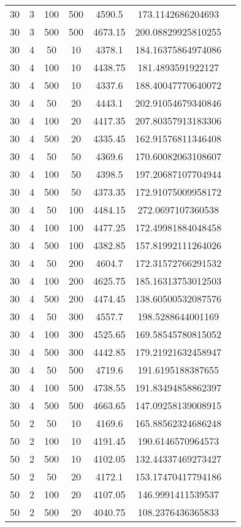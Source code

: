 {\begin{longtabu}{S
S
S
S
S
S[round-mode=places,round-precision=0]
S[round-mode=places,round-precision=0]}
30 & 3 & 100 & 500 & 4590.5 & 173.1142686204693 \\
30 & 3 & 500 & 500 & 4673.15 & 200.08829925810255 \\
30 & 4 & 50 & 10 & 4378.1 & 184.16375864974086 \\
30 & 4 & 100 & 10 & 4438.75 & 181.4893591922127 \\
30 & 4 & 500 & 10 & 4337.6 & 188.40047770640072 \\
30 & 4 & 50 & 20 & 4443.1 & 202.91054679340846 \\
30 & 4 & 100 & 20 & 4417.35 & 207.80357913183306 \\
30 & 4 & 500 & 20 & 4335.45 & 162.91576811346408 \\
30 & 4 & 50 & 50 & 4369.6 & 170.60082063108607 \\
30 & 4 & 100 & 50 & 4398.5 & 197.20687107704944 \\
30 & 4 & 500 & 50 & 4373.35 & 172.91075009958172 \\
30 & 4 & 50 & 100 & 4484.15 & 272.0697107360538 \\
30 & 4 & 100 & 100 & 4477.25 & 172.49981884048458 \\
30 & 4 & 500 & 100 & 4382.85 & 157.81992111264026 \\
30 & 4 & 50 & 200 & 4604.7 & 172.31572766291532 \\
30 & 4 & 100 & 200 & 4625.75 & 185.16313753012503 \\
30 & 4 & 500 & 200 & 4474.45 & 138.60500532087576 \\
30 & 4 & 50 & 300 & 4557.7 & 198.5288644001169 \\
30 & 4 & 100 & 300 & 4525.65 & 169.58545780815052 \\
30 & 4 & 500 & 300 & 4442.85 & 179.21921632458947 \\
30 & 4 & 50 & 500 & 4719.6 & 191.6195188387655 \\
30 & 4 & 100 & 500 & 4738.55 & 191.83494858862397 \\
30 & 4 & 500 & 500 & 4663.65 & 147.09258139008915 \\
50 & 2 & 50 & 10 & 4169.6 & 165.88562324686248 \\
50 & 2 & 100 & 10 & 4191.45 & 190.6146570964573 \\
50 & 2 & 500 & 10 & 4102.05 & 132.44337469273427 \\
50 & 2 & 50 & 20 & 4172.1 & 153.17470417794186 \\
50 & 2 & 100 & 20 & 4107.05 & 146.9991411539537 \\
50 & 2 & 500 & 20 & 4040.75 & 108.2376436365833 \\

\end{longtabu}}
